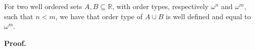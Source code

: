 

\begin{lemma}
For two well ordered sets $A, B \subseteq \mathbb{R}$, with order types, respectively $\omega^n$ 
and $\omega^m$, 
such that $n < m$, we have that order type of $A \cup B$ is well defined and 
equal to $\omega^m$.
\end{lemma}
\textbf{Proof.} \\

